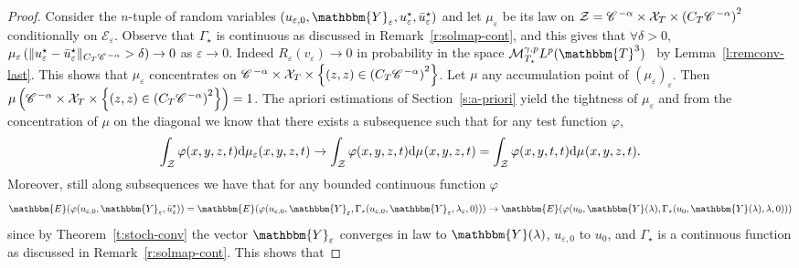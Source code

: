 \begin{proof}
  Consider the $n$-tuple of random variables $(u_{\varepsilon, 0},
  \mathbbm{Y}_{\varepsilon}, u_{\varepsilon}^{\star},
  \bar{u}_{\varepsilon}^{\star})$ and let $\mu_{\varepsilon}$ be its law on
  $\mathcal{Z}= \mathscr{C} \hspace{.1em}^{- \alpha} \times \mathcal{X}_T \times \left( C_T \mathscr{C} \hspace{.1em}^{-
  \alpha} \right)^2$ conditionally on $\mathcal{E}_{\varepsilon}$. Observe
  that $\Gamma_{\star}$ is continuous as discussed in
  Remark~\ref{r:solmap-cont}, and this gives that $\forall \delta > 0$,
  $\mu_{\varepsilon} \left( \| u_{\varepsilon}^{\star} -
  \bar{u}_{\varepsilon}^{\star} \|_{C_T \mathscr{C} \hspace{.1em}^{- \alpha}} > \delta \right)
  \rightarrow 0$ as $\varepsilon \rightarrow 0$. Indeed $R_{\varepsilon}
  (v_{\varepsilon}) \rightarrow 0$ in probability in the space
  $\mathcal{M}^{\gamma, p}_{T_{\star}} L^p (\mathbbm{T}^3)$ \ by
  Lemma~\ref{l:remconv-last}. This shows that $\mu_{\varepsilon}$ concentrates
  on $\mathscr{C} \hspace{.1em}^{- \alpha} \times \mathcal{X}_T \times \left\{ (z, z) \in \left( C_T
  \mathscr{C} \hspace{.1em}^{- \alpha} \right)^2 \right\}$. Let $\mu$ any accumulation point of
  $(\mu_{\varepsilon})_{\varepsilon}$. Then $\mu \left( \mathscr{C} \hspace{.1em}^{- \alpha} \times
  \mathcal{X}_T \times \left\{ (z, z) \in \left( C_T \mathscr{C} \hspace{.1em}^{- \alpha} \right)^2
  \right\} \right) = 1$. The apriori estimations of Section~\ref{s:a-priori}
  yield the tightness of $\mu_{\varepsilon}$ and from the concentration of
  $\mu$ on the diagonal we know that there exists a subsequence such that for
  any test function $\varphi$,
  \begin{equation}
    \int_{\mathcal{Z}} \varphi (x, y, z, t) \mathrm{d} \mu_{\varepsilon} (x, y, z,
    t) \rightarrow \int_{\mathcal{Z}} \varphi (x, y, z, t) \mathrm{d} \mu_{} (x,
    y, z, t) = \int_{\mathcal{Z}} \varphi (x, y, t, t) \mathrm{d} \mu_{} (x, y, z,
    t) . \label{e:conv-law-1}
  \end{equation}
  Moreover, still along subsequences we have that for any bounded continuous
  function $\varphi$
  \[ \mathbbm{E} (\varphi (u_{\varepsilon, 0}, \mathbbm{Y}_{\varepsilon},
     \bar{u}_{\varepsilon}^{\star})) =\mathbbm{E} (\varphi (u_{\varepsilon,
     0}, \mathbbm{Y}_{\varepsilon}, \Gamma_{\star} (u_{\varepsilon, 0},
     \mathbbm{Y}_{\varepsilon}, \lambda_{\varepsilon}, 0))) \rightarrow
     \mathbbm{E} (\varphi (u_0, \mathbbm{Y} (\lambda), \Gamma_{\star} (u_0,
     \mathbbm{Y} (\lambda), \lambda, 0))) \]
  since by Theorem~\ref{t:stoch-conv} the vector $\mathbbm{Y}_{\varepsilon}$
  converges in law to $\mathbbm{Y} (\lambda)$, $u_{\varepsilon, 0}$ to $u_0$,
  and $\Gamma_{\star}$ is a continuous function as discussed in
  Remark~\ref{r:solmap-cont}. This shows that

\end{proof}
